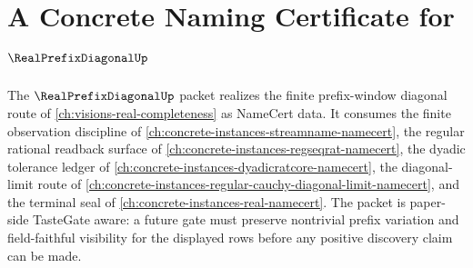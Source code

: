 \chapter{A Concrete Naming Certificate for $\RealPrefixDiagonalUp$}
\label{ch:concrete-instances-real-prefix-diagonal-namecert}

The $\RealPrefixDiagonalUp$ packet realizes the finite prefix-window diagonal route of \autoref{ch:visions-real-completeness} as NameCert data. It consumes the finite observation discipline of \autoref{ch:concrete-instances-streamname-namecert}, the regular rational readback surface of \autoref{ch:concrete-instances-regseqrat-namecert}, the dyadic tolerance ledger of \autoref{ch:concrete-instances-dyadicratcore-namecert}, the diagonal-limit route of \autoref{ch:concrete-instances-regular-cauchy-diagonal-limit-namecert}, and the terminal seal of \autoref{ch:concrete-instances-real-namecert}. The packet is paper-side TasteGate aware: a future gate must preserve nontrivial prefix variation and field-faithful visibility for the displayed rows before any positive discovery claim can be made.



